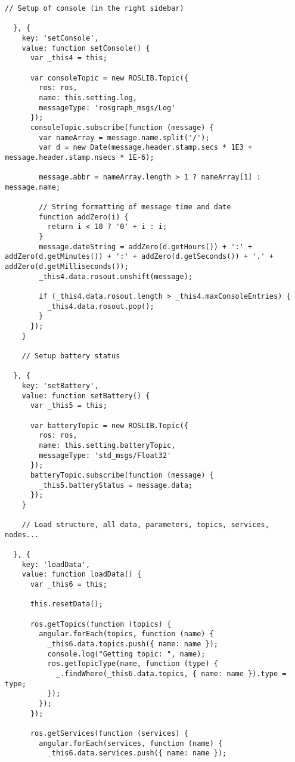 \begin{lstlisting}[breaklines=true,basicstyle=\tiny]
    // Setup of console (in the right sidebar)

  }, {
    key: 'setConsole',
    value: function setConsole() {
      var _this4 = this;

      var consoleTopic = new ROSLIB.Topic({
        ros: ros,
        name: this.setting.log,
        messageType: 'rosgraph_msgs/Log'
      });
      consoleTopic.subscribe(function (message) {
        var nameArray = message.name.split('/');
        var d = new Date(message.header.stamp.secs * 1E3 + message.header.stamp.nsecs * 1E-6);

        message.abbr = nameArray.length > 1 ? nameArray[1] : message.name;

        // String formatting of message time and date
        function addZero(i) {
          return i < 10 ? '0' + i : i;
        }
        message.dateString = addZero(d.getHours()) + ':' + addZero(d.getMinutes()) + ':' + addZero(d.getSeconds()) + '.' + addZero(d.getMilliseconds());
        _this4.data.rosout.unshift(message);

        if (_this4.data.rosout.length > _this4.maxConsoleEntries) {
          _this4.data.rosout.pop();
        }
      });
    }

    // Setup battery status

  }, {
    key: 'setBattery',
    value: function setBattery() {
      var _this5 = this;

      var batteryTopic = new ROSLIB.Topic({
        ros: ros,
        name: this.setting.batteryTopic,
        messageType: 'std_msgs/Float32'
      });
      batteryTopic.subscribe(function (message) {
        _this5.batteryStatus = message.data;
      });
    }

    // Load structure, all data, parameters, topics, services, nodes...

  }, {
    key: 'loadData',
    value: function loadData() {
      var _this6 = this;

      this.resetData();

      ros.getTopics(function (topics) {
        angular.forEach(topics, function (name) {
          _this6.data.topics.push({ name: name });
          console.log("Getting topic: ", name);
          ros.getTopicType(name, function (type) {
            _.findWhere(_this6.data.topics, { name: name }).type = type;
          });
        });
      });

      ros.getServices(function (services) {
        angular.forEach(services, function (name) {
          _this6.data.services.push({ name: name });


\end{lstlisting}

